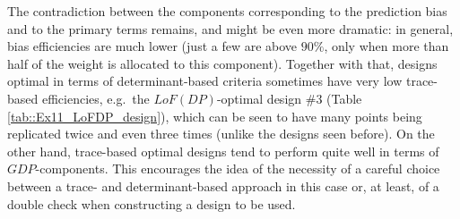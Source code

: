 \begin{table}[h]
\centering
\caption{Example 1. DP-optimal design \#$2$}
\label{tab::Ex11_DP_design}
\end{table}
The contradiction between the components corresponding to the prediction bias and to the primary terms remains, and might be even more dramatic: in general, bias efficiencies are much lower (just a few are above $90\%$, only when more than half of the weight is allocated to this component). Together with that, designs optimal in terms of determinant-based criteria sometimes have very low trace-based efficiencies, e.g.~the $LoF(DP)$-optimal design \#$3$ (Table \ref{tab::Ex11_LoFDP_design}), which can be seen to have many points being replicated twice and even three times (unlike the designs seen before).
On the other hand, trace-based optimal designs tend to perform quite well in terms of $GDP$-components. This encourages the idea of the necessity of a careful choice between a trace- and determinant-based approach in this case or, at least, of a double check when constructing a design to be used. 

